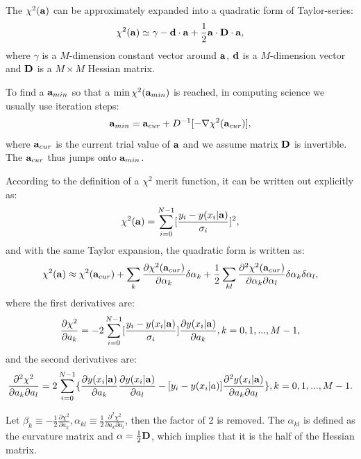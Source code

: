 The $\chi^2(\bf a)$ can be approximately expanded into a quadratic form of Taylor-series:
\begin{equation} \label{eq:1}
\chi^2({\bf a})\simeq \gamma-{\bf d\cdot a}+\frac{1}{2}{\bf a\cdot D\cdot a},
\end{equation}
where $\gamma$ is a $M$-dimension constant vector around $\bf a$, $\bf d$ is a $M$-dimension vector and $\bf D$ is a $M\times M$ Hessian matrix.

To find a ${\bf a}_{min}$ so that a $\min\chi^2({\bf a}_{min})$ is reached, in computing science we usually use iteration steps: 
\begin{equation} \label{eq:2}{\bf a}_{min}={\bf a}_{cur}+D^{-1}[-\nabla\chi^2({\bf a}_{cur})],\end{equation} 
where ${\bf a}_{cur}$ is the current trial value of $\bf a$ and we assume matrix $\bf D$ is invertible. The ${\bf a}_{cur}$ thus jumps onto ${\bf a}_{min}$. 

According to the definition of a $\chi^2$ merit function, it can be written out explicitly as:
\begin{equation}
\chi^2({\bf a})=\sum_{i=0}^{N-1}[\frac{y_i-y(x_i|{\bf a})}{\sigma_i}]^2,
\end{equation}
and with the same Taylor expansion, the quadratic form is written as:
\begin{equation}\label{eq:3}
\chi^2({\bf a})\approx\chi^2({\bf a}_{cur})+\sum_k\frac{\partial \chi^2({\bf a}_{cur})}{\partial \alpha_k}\delta\alpha_k+\frac{1}{2}\sum_{kl}\frac{\partial^2\chi^2({\bf a}_{cur})}{\partial\alpha_k\partial\alpha_l}\delta\alpha_k\delta\alpha_l, 
\end{equation}
where the first derivatives are:
\begin{equation}\label{eq:4}
\frac{\partial \chi^2}{\partial a_k}=-2\sum_{i=0}^{N-1}[\frac{y_i-y(x_i|{\bf a})}{\sigma_i}]\frac{\partial y(x_i|{\bf a})}{\partial a_k}, k = 0,1,...,M-1,
\end{equation}
and the second derivatives are:
\begin{equation}\label{eq:5}
\frac{\partial^2 \chi^2}{\partial a_k\partial a_l}=2\sum_{i=0}^{N-1}\{\frac{\partial y(x_i|{\bf a})}{\partial a_k}\frac{\partial y(x_i|{\bf a})}{\partial a_l}-[y_i-y(x_i|a)]\frac{\partial^2 y(x_i|{\bf a})}{\partial a_k\partial a_l}\}, k = 0, 1, ..., M-1.
\end{equation}

Let $\beta_k\equiv-\frac{1}{2}\frac{\partial\chi^2}{\partial a_k}, \alpha_{kl}\equiv \frac{1}{2}\frac{\partial^2\chi^2}{\partial a_k\partial a_l}$, then the factor of 2 is removed. The $\alpha_{kl}$ is defined as the curvature matrix and ${\bf \alpha}=\frac{1}{2}{\bf D}$, which implies that it is the half of the Hessian matrix.

